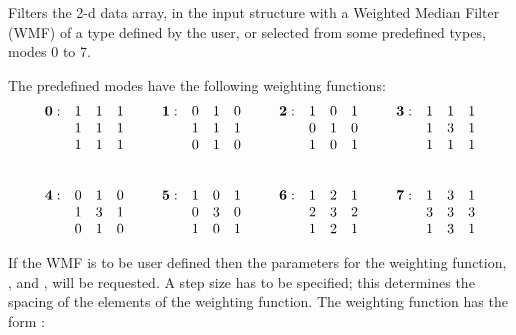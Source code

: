 {
\begin{manroutinedescription}
  Filters the 2-d data array, in the input {} structure with a
  Weighted Median Filter (WMF) of a type defined by the user,
  or selected from some predefined types, modes 0 to 7.

  The predefined modes have the following weighting functions:  \mbox {}
\[
\begin{array}{lccclccclccclccc}
{\bf 0:}&1&1&1\hspace{4ex}&{\bf 1:}&0&1&0\hspace{4ex}&{\bf 2:}&1&0&1\hspace{4ex}&{\bf 3:}&1&1&1 \\
  &  1&1&1\hspace{4ex}&&  1&1&1\hspace{4ex}&&  0&1&0\hspace{4ex}&&  1&3&1 \\
  &  1&1&1\hspace{4ex}&&  0&1&0\hspace{4ex}&&  1&0&1\hspace{4ex}&&  1&1&1 \\
\\
\\
{\bf 4:}&0&1&0\hspace{4ex}&{\bf 5:}&1&0&1\hspace{4ex}&{\bf 6:}&1&2&1\hspace{4ex}&{\bf 7:}&1&3&1 \\
  &  1&3&1\hspace{4ex}&&  0&3&0\hspace{4ex}&&  2&3&2\hspace{4ex}&&  3&3&3 \\
  &  0&1&0\hspace{4ex}&&  1&0&1\hspace{4ex}&&  1&2&1\hspace{4ex}&&  1&3&1
\end{array}
\]

  If the WMF is to be user defined then the parameters for the
  weighting function, {}, {} and {}, will be requested.
  A step size has to be specified; this determines the spacing of
  the elements of the weighting function. The weighting function has
  the form :
\[
\begin{array}{ccccc}


\end{array}\]
\end{manroutinedescription}}
